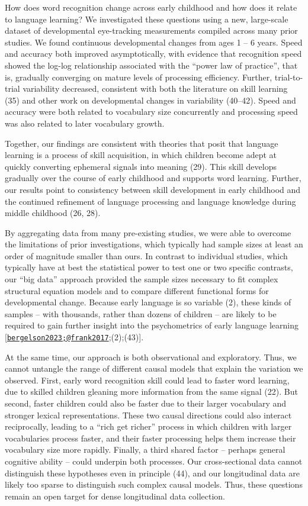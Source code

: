\documentclass[9pt,twocolumn,twoside,]{pnas-new}
\begin{document}
How does word recognition change across early childhood and how does it
relate to language learning? We investigated these questions using a
new, large-scale dataset of developmental eye-tracking measurements
compiled across many prior studies. We found continuous developmental
changes from ages 1 -- 6 years. Speed and accuracy both improved
asymptotically, with evidence that recognition speed showed the log-log
relationship associated with the ``power law of practice'', that is,
gradually converging on mature levels of processing efficiency. Further,
trial-to-trial variability decreased, consistent with both the
literature on skill learning (35) and other work on developmental
changes in variability (40--42). Speed and accuracy were both related to
vocabulary size concurrently and processing speed was also related to
later vocabulary growth.

Together, our findings are consistent with theories that posit that
language learning is a process of skill acquisition, in which children
become adept at quickly converting ephemeral signals into meaning (29).
This skill develops gradually over the course of early childhood and
supports word learning. Further, our results point to consistency
between skill development in early childhood and the continued
refinement of language processing and language knowledge during middle
childhood (26, 28).

By aggregating data from many pre-existing studies, we were able to
overcome the limitations of prior investigations, which typically had
sample sizes at least an order of magnitude smaller than ours. In
contrast to individual studies, which typically have at best the
statistical power to test one or two specific contrasts, our ``big
data'' approach provided the sample sizes necessary to fit complex
structural equation models and to compare different functional forms for
developmental change. Because early language is so variable (2), these
kinds of samples -- with thousands, rather than dozens of children --
are likely to be required to gain further insight into the psychometrics
of early language learning
{[}\href{mailto:bergelson2023;@frank2017}{\nolinkurl{bergelson2023;@frank2017}};(2);(43){]}.

At the same time, our approach is both observational and exploratory.
Thus, we cannot untangle the range of different causal models that
explain the variation we observed. First, early word recognition skill
could lead to faster word learning, due to skilled children gleaning
more information from the same signal (22). But second, faster children
could also be faster due to their larger vocabulary and stronger lexical
representations. These two causal directions could also interact
reciprocally, leading to a ``rich get richer'' process in which children
with larger vocabularies process faster, and their faster processing
helps them increase their vocabulary size more rapidly. Finally, a third
shared factor -- perhaps general cognitive ability -- could underpin
both processes. Our cross-sectional data cannot distinguish these
hypotheses even in principle (44), and our longitudinal data are likely
too sparse to distinguish such complex causal models. Thus, these
questions remain an open target for dense longitudinal data collection.
\end{document}
